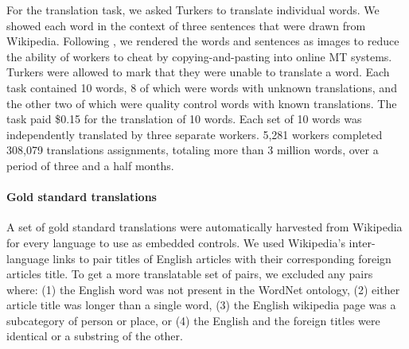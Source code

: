 \documentclass[11pt]{article}
\begin{document}
For the translation task, we asked Turkers to translate individual words.  We showed each word in the context of three sentences that were drawn from Wikipedia.  Following , we rendered the words and sentences as images to reduce the ability of workers to cheat by copying-and-pasting into online MT systems. 
%
Turkers were allowed to mark that they were unable to translate a word. Each task contained 10 words, 8 of which were words with unknown translations, and the other two of which were quality control words with known translations.   
%
The task paid \$0.15 for the translation of 10 words.  
% 
Each set of 10 words was independently translated by three separate workers.  5,281 workers completed 308,079 translations assignments, totaling more than 3 million words, over a period of three and a half months.

\paragraph{Gold standard translations} 
A set of gold standard translations were automatically harvested from Wikipedia  for every language to use as embedded controls. We used Wikipedia's inter-language links to pair titles of English articles with their corresponding foreign articles title.  To get a more translatable set of pairs, we excluded any pairs where: (1) the English word was not present in the WordNet ontology, (2) either article title was longer than a single word, (3) the English wikipedia page was a subcategory of person or place, or (4) the English and the foreign titles were identical or a substring of the other.
\end{document}
